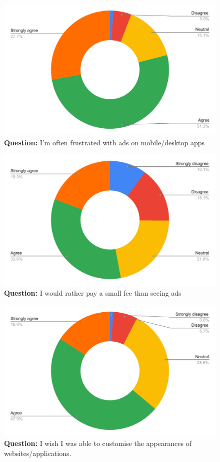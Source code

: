 \begin{figure}[H]
  \centering
  \includegraphics[width=13cm]{thesis/paper/images/p1_q6.pdf}
  \textbf{Question:} I'm often frustrated with ads on mobile/desktop apps
\end{figure}

\begin{figure}[H]
  \centering
  \includegraphics[width=13cm]{thesis/paper/images/p1_q7.pdf}
  \textbf{Question:} I would rather pay a small fee than seeing ads
\end{figure}

\begin{figure}[H]
  \centering
  \includegraphics[width=13cm]{thesis/paper/images/p1_q8.pdf}
  \textbf{Question:} I wish I was able to customise the appearances of websites/applications.
\end{figure}

